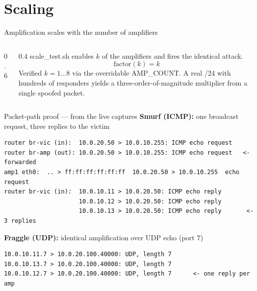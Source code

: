 \documentclass[aspectratio=169,10pt]{beamer}
\newcommand{\code}[1]{{\ttfamily #1}}
\begin{document}
\section{Scaling}
\begin{frame}{Amplification scales with the number of amplifiers}
  \begin{columns}[c]
    \begin{column}{0.6\textwidth}
      \centering
    \end{column}
    \begin{column}{0.4\textwidth}
      \small
      \code{scale\_test.sh} enables $k$ of the amplifiers and fires the identical attack.
      \[ \text{factor}(k)=k \]
      \footnotesize
      Verified $k=1\ldots8$ via the overridable \code{AMP\_COUNT}. A real /24 with
      hundreds of responders yields a three-order-of-magnitude multiplier from a single
      spoofed packet.
    \end{column}
  \end{columns}
\end{frame}

\begin{frame}[fragile]{Packet-path proof — from the live captures}
  \textbf{Smurf (ICMP):} one broadcast request, three replies to the victim
\begin{verbatim}
router br-vic (in):  10.0.20.50 > 10.0.10.255: ICMP echo request
router br-amp (out): 10.0.20.50 > 10.0.10.255: ICMP echo request   <- forwarded
amp1 eth0:  .. > ff:ff:ff:ff:ff:ff  10.0.20.50 > 10.0.10.255  echo request
router br-vic (in):  10.0.10.11 > 10.0.20.50: ICMP echo reply
                     10.0.10.12 > 10.0.20.50: ICMP echo reply
                     10.0.10.13 > 10.0.20.50: ICMP echo reply       <- 3 replies
\end{verbatim}
  \textbf{Fraggle (UDP):} identical amplification over UDP echo (port 7)
\begin{verbatim}
10.0.10.11.7 > 10.0.20.100.40000: UDP, length 7
10.0.10.13.7 > 10.0.20.100.40000: UDP, length 7
10.0.10.12.7 > 10.0.20.100.40000: UDP, length 7      <- one reply per amp
\end{verbatim}
\end{frame}
\end{document}
